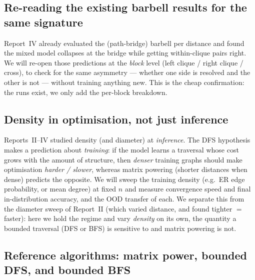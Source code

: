 \documentclass[11pt,a4paper]{article}
\begin{document}
\subsection{Re-reading the existing barbell results for the same signature}
\label{sec:plan-reuse}

Report~IV already evaluated the (path-bridge) barbell per distance and found the mixed model
collapses at the bridge while getting within-clique pairs right. We will re-open those
predictions at the \emph{block} level (left clique / right clique / cross), to check for the
same asymmetry --- whether one side is resolved and the other is not --- without training
anything new. This is the cheap confirmation: the runs exist, we only add the per-block
breakdown.

\subsection{Density in optimisation, not just inference}
\label{sec:plan-density}

Reports~II--IV studied density (and diameter) at \emph{inference}. The DFS hypothesis makes a
prediction about \emph{training}: if the model learns a traversal whose cost grows with the
amount of structure, then \emph{denser} training graphs should make optimisation \emph{harder /
slower}, whereas matrix powering (shorter distances when dense) predicts the opposite. We will
sweep the training density (e.g.\ ER edge probability, or mean degree) at fixed $n$ and measure
convergence speed and final in-distribution accuracy, and the OOD transfer of each. We separate
this from the diameter sweep of Report~II (which varied distance, and found tighter $=$ faster):
here we hold the regime and vary \emph{density} on its own, the quantity a bounded traversal (DFS
or BFS) is sensitive to and matrix powering is not.

\subsection{Reference algorithms: matrix power, bounded DFS, and bounded BFS}
\label{sec:plan-oracle}
\end{document}
